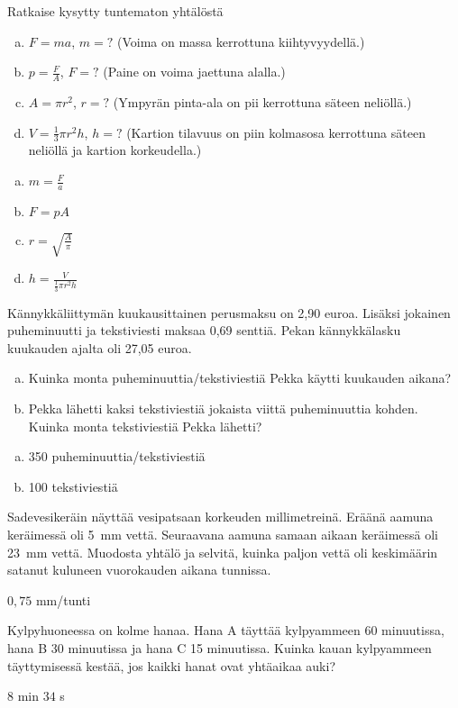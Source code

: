 \begin{tehtava}
Ratkaise kysytty tuntematon yhtälöstä
\begin{enumerate}[a)]
\item $F=ma$, $m=?$ (Voima on massa kerrottuna kiihtyvyydellä.)
\item $p=\frac{F}{A}$, $F=?$ (Paine on voima jaettuna alalla.)
\item $A=\pi r^2$, $r=?$ (Ympyrän pinta-ala on pii kerrottuna säteen neliöllä.)
\item $V=\frac{1}{3} \pi r^2 h$, $h=?$ (Kartion tilavuus on piin kolmasosa
kerrottuna säteen neliöllä ja kartion korkeudella.)
\end{enumerate}
\begin{vastaus}
\begin{enumerate}[a)]
\item $m=\frac{F}{a}$
\item $F=p A$
\item $r=\sqrt{\frac{A}{\pi}}$
\item $h=\frac{V}{ \frac{1}{3} \pi r^2 h}$
\end{enumerate}
\end{vastaus}
\end{tehtava}

\begin{tehtava}
Kännykkäliittymän kuukausittainen perusmaksu on 2,90 euroa. Lisäksi jokainen puheminuutti ja tekstiviesti maksaa 0,69 senttiä. Pekan kännykkälasku kuukauden
ajalta oli 27,05 euroa.

\begin{enumerate}[a)]
	\item Kuinka monta puheminuuttia/tekstiviestiä Pekka käytti kuukauden aikana?
	\item Pekka lähetti kaksi tekstiviestiä jokaista viittä puheminuuttia kohden. Kuinka monta tekstiviestiä Pekka lähetti?
\end{enumerate}

	\begin{vastaus}
		\begin{enumerate}[a)]
			\item 350 puheminuuttia/tekstiviestiä
			\item 100 tekstiviestiä
		\end{enumerate}
	\end{vastaus}
\end{tehtava}

\begin{tehtava}
Sadevesikeräin näyttää vesipatsaan korkeuden millimetreinä. Eräänä aamuna
keräimessä oli 5~mm vettä. Seuraavana aamuna samaan aikaan keräimessä oli 23~mm vettä. Muodosta yhtälö ja selvitä, kuinka paljon vettä oli keskimäärin satanut kuluneen vuorokauden aikana tunnissa.
	\begin{vastaus}
	$0,75$ mm/tunti
	\end{vastaus}
\end{tehtava}

\begin{tehtava}
Kylpyhuoneessa on kolme hanaa. Hana A täyttää kylpyammeen 60 minuutissa, hana B 30 minuutissa ja hana C 15 minuutissa. Kuinka kauan kylpyammeen täyttymisessä kestää, jos kaikki hanat ovat yhtäaikaa auki?
\begin{vastaus}
$8$ min $34$ s
\end{vastaus}
\end{tehtava}
